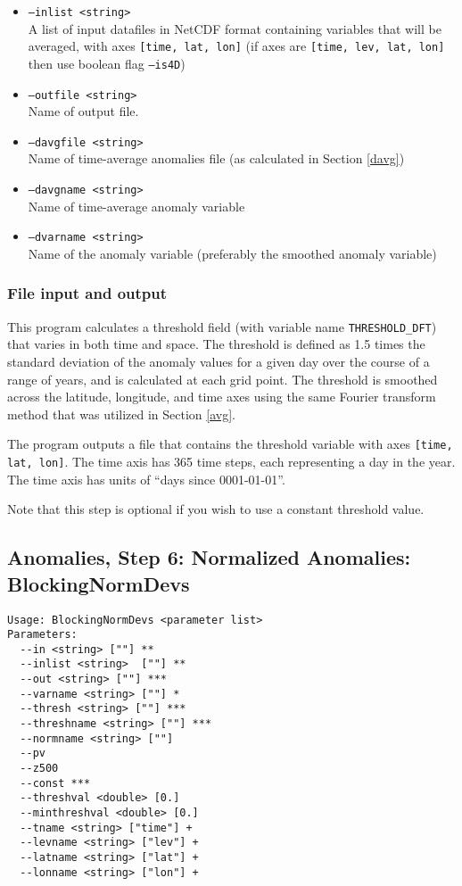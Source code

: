 \documentclass{article}
\begin{document}
\begin{itemize}
\item[]\texttt{--inlist <string>} \\ A list of input datafiles in NetCDF format containing variables that will be averaged, with axes \texttt{[time, lat, lon]} (if axes are \texttt{[time, lev, lat, lon] } then use boolean flag \texttt{--is4D})
\item[]\texttt{--outfile <string>} \\ Name of output file.
\item[]\texttt{--davgfile <string>} \\ Name of time-average anomalies file (as calculated in Section \ref{davg})
\item[]\texttt{--davgname <string>} \\ Name of time-average anomaly variable
\item[]\texttt{--dvarname <string>} \\ Name of the anomaly variable (preferably the smoothed anomaly variable)
\end{itemize}

\subsubsection{File input and output}
This program calculates a threshold field (with variable name \texttt{THRESHOLD\_DFT}) that varies in both time and space. The threshold is defined as 1.5 times the standard deviation of the anomaly values for a given day over the course of a range of years, and is calculated at each grid point. The threshold is smoothed across the latitude, longitude, and time axes using the same Fourier transform method that was utilized in Section \ref{avg}.

The program outputs a file that contains the threshold variable with axes \texttt{[time, lat, lon]}. The time axis has 365 time steps, each representing a day in the year. The time axis has units of ``days since 0001-01-01''.

Note that this step is optional if you wish to use a constant threshold value.

\subsection{Anomalies, Step 6: Normalized Anomalies: BlockingNormDevs}\label{ndev}
\begin{verbatim}
Usage: BlockingNormDevs <parameter list>
Parameters:
  --in <string> [""] **
  --inlist <string>  [""] **
  --out <string> [""] ***
  --varname <string> [""] *
  --thresh <string> [""] ***
  --threshname <string> [""] ***
  --normname <string> [""]
  --pv
  --z500
  --const ***
  --threshval <double> [0.]
  --minthreshval <double> [0.]
  --tname <string> ["time"] +
  --levname <string> ["lev"] +
  --latname <string> ["lat"] +
  --lonname <string> ["lon"] +
\end{verbatim}
\end{document}
